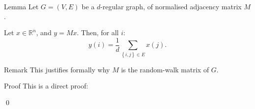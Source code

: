 \documentclass[a4paper]{article}
\begin{document}
\begin{parag}{Lemma}
    Let $G = \left(V, E\right)$ be a $d$-regular graph, of normalised adjacency matrix $M$.

    Let $x \in \mathbb{R}^n$, and $y = M x$. Then, for all $i$: 
    \[y\left(i\right) = \frac{1}{d} \sum_{\left\{i, j\right\} \in E} x\left(j\right).\]

    \begin{subparag}{Remark}
        This justifies formally why $M$ is the random-walk matrix of $G$.
    \end{subparag}

    \begin{subparag}{Proof}
        This is a direct proof:
        
        \qed
    \end{subparag}
\end{parag}
\end{document}

